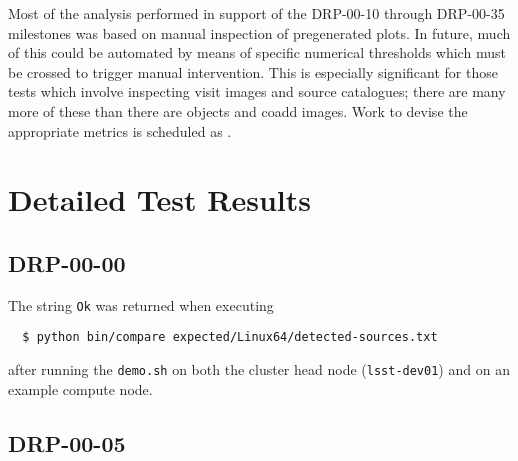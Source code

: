 \documentclass[DM,STR,toc]{lsstdoc}
\begin{document}
Most of the analysis performed in support of the DRP-00-10 through DRP-00-35 milestones was based on manual inspection of pregenerated plots.
In future, much of this could be automated by means of specific numerical thresholds which must be crossed to trigger manual intervention.
This is especially significant for those tests which involve inspecting visit images and source catalogues; there are many more of these than there are objects and coadd images.
Work to devise the appropriate metrics is scheduled as .

\newpage

\section{Detailed Test Results}
\label{sect:detailed}

\subsection{DRP-00-00}
\label{sect:detail-drp-00-00}

The string \texttt{Ok} was returned when executing

\begin{verbatim}
  $ python bin/compare expected/Linux64/detected-sources.txt
\end{verbatim}

after running the \texttt{demo.sh} on both the cluster head node (\texttt{lsst-dev01}) and on an example compute node.

\subsection{DRP-00-05}
\label{sect:detail-drp-00-05}
\end{document}
